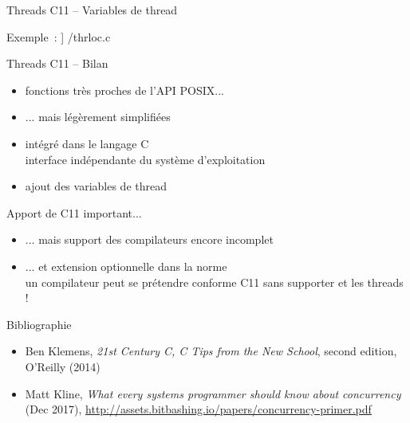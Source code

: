 \begin {frame} [fragile] {Threads C11 -- Variables de thread}

    Exemple~:
    \scriptsize\lstmonstyle] {\inc/thrloc.c}

\end{frame}

\begin {frame} {Threads C11 -- Bilan}
    \begin {itemize}
	\item fonctions très proches de l'API POSIX...
	\item ... mais légèrement simplifiées
	\item intégré dans le langage C \\
	    \implique interface indépendante du système d'exploitation
	\item ajout des variables de thread
    \end {itemize}

    \vspace* {3mm}

    Apport de C11 important...
    \begin {itemize}
	\item ... mais support des compilateurs encore incomplet
	\item ... et extension optionnelle dans la norme
	    \\
	    \implique un compilateur peut se prétendre conforme C11 sans
	    supporter  et les threads !
    \end {itemize}
\end {frame}



\begin {frame} {Bibliographie}

    \begin {itemize}
	\item Ben Klemens, \textit {21st Century C, C Tips from the
	    New School}, second edition, O'Reilly (2014)

	\item Matt Kline, \textit {What every systems programmer should
	    know about concurrency} (Dec 2017),
	    \url {http://assets.bitbashing.io/papers/concurrency-primer.pdf}
    \end {itemize}

\end {frame}
